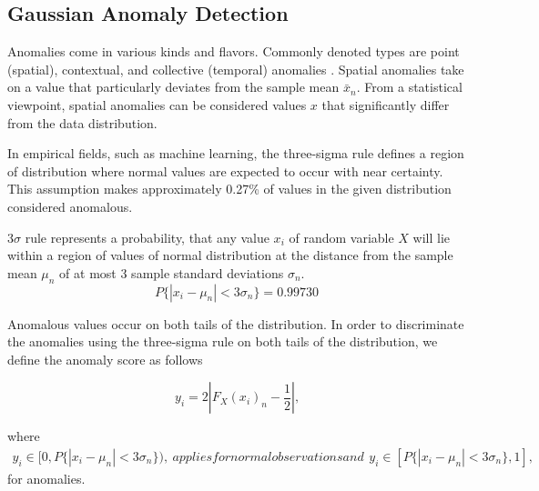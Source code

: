 \subsection{Gaussian Anomaly Detection}\label{AA:Anomaly}
Anomalies come in various kinds and flavors. Commonly denoted types are point (spatial), contextual, and collective (temporal) anomalies \cite{Chandola2009}.
Spatial anomalies take on a value that particularly deviates from the sample mean \(\bar x_n\). From a statistical viewpoint, spatial anomalies can be considered values \(x\) that significantly differ from the data distribution.

In empirical fields, such as machine learning, the three-sigma rule defines a region of distribution where normal values are expected to occur with near certainty. This assumption makes approximately 0.27\% of values in the given distribution considered anomalous.

\begin{definition}
3\(\sigma\) rule represents a probability, that any value \(x_i\) of random variable \(X\) will lie within a region of values of normal distribution at the distance from the sample mean \(\mu_n\) of at most 3 sample standard deviations \(\sigma_n\).
\begin{equation}
P\{|x_i-\mu_n|<3\sigma_n\}=0.99730
\end{equation}
\end{definition}

Anomalous values occur on both tails of the distribution. In order to discriminate the anomalies using the three-sigma rule on both tails of the distribution, we define the anomaly score as follows

\begin{equation}
y_i = 2 \left|{F_X(x_i)_n - \frac{1}{2}}\right|\text{,}\label{eq:score}
\end{equation}

where
\begin{subequations}

\begin{align}
y_i \in [0,P\{|x_i-\mu_n|<3\sigma_n\})\text{,}\label{eq:score_norm}
\end{align}

applies for normal observations and

\begin{align}
y_i \in [P\{|x_i-\mu_n|<3\sigma_n\},1]\text{,}\label{eq:score_anomaly}
\end{align}
\end{subequations}
 for anomalies.

